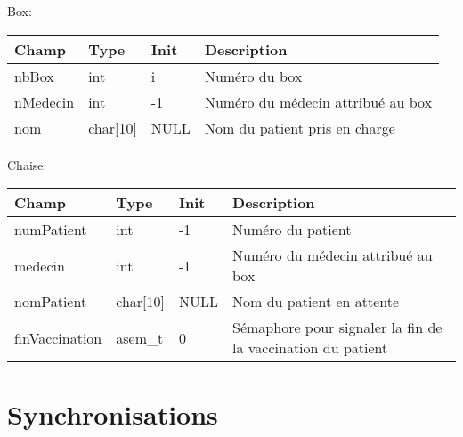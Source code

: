 \documentclass[a4paper]{article}
\makeatletter
\newenvironment{expl}{%
  \begin{list}{}{%
      \small\itshape%
      \topsep\z@%
      \listparindent0pt%
      \parsep0.75\baselineskip%
      \setlength{\leftmargin}{20mm}%
      \setlength{\rightmargin}{20mm}%
    }
  \item[]}%
  {\end{list}}
\makeatother
\begin{document}
\begin{expl}
\begin{tabularx}{\linewidth}{|l|l|l|X|}
  \end{tabularx}
  
  Box: 
  \newline
  \newline
\begin{tabularx}{\linewidth}{|l|l|l|X|}
    \hline
    Champ & Type & Init & Description \\ \hline%
    nbBox & int & i & Numéro du box \\ \hline%
    nMedecin & int & -1 & Numéro du médecin attribué au box \\ \hline%
    nom & char[10] & NULL & Nom du patient pris en charge \\ \hline%
\end{tabularx}

    Chaise:
    \newline
    \newline
\begin{tabularx}{\linewidth}{|l|l|l|X|}
    \hline
    Champ & Type & Init & Description \\ \hline%
    numPatient & int & -1 & Numéro du patient \\ \hline%
    medecin & int & -1 & Numéro du médecin attribué au box \\ \hline%
    nomPatient & char[10] & NULL & Nom du patient en attente \\ \hline%
    finVaccination & asem\_t & 0 &Sémaphore pour signaler la fin de la vaccination du patient \\ \hline%
\end{tabularx}

\end{expl}



\section{Synchronisations}
\end{document}
